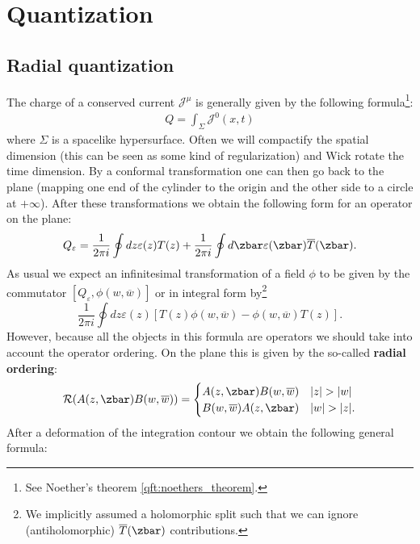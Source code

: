 \section{Quantization}


\subsection{Radial quantization}

    The charge of a conserved current $\mathcal{J}^\mu$ is generally given by the following formula\footnote{See Noether's theorem \ref{qft:noethers_theorem}.}:
    \begin{gather}
        Q = \int_\Sigma\mathcal{J}^0(x, t)
    \end{gather}
    where $\Sigma$ is a spacelike hypersurface. Often we will compactify the spatial dimension (this can be seen as some kind of regularization) and Wick rotate the time dimension. By a conformal transformation one can then go back to the plane (mapping one end of the cylinder to the origin and the other side to a circle at $+\infty$). After these transformations we obtain the following form for an operator on the plane:
    \begin{gather}
        Q_\varepsilon = \frac{1}{2\pi i}\oint dz\varepsilon(z)T(z) + \frac{1}{2\pi i}\oint d\zbar\varepsilon(\zbar)\overline{T}(\zbar).
    \end{gather}
    As usual we expect an infinitesimal transformation of a field $\phi$ to be given by the commutator $[Q_\varepsilon, \phi(w, \overline{w})]$ or in integral form by\footnote{We implicitly assumed a holomorphic split such that we can ignore (antiholomorphic) $\overline{T}(\zbar)$ contributions.} \[\frac{1}{2\pi i}\oint dz\varepsilon(z)[T(z)\phi(w, \overline{w}) - \phi(w, \overline{w})T(z)].\] However, because all the objects in this formula are operators we should take into account the operator ordering. On the plane this is given by the so-called \textbf{radial ordering}:
    \begin{gather}
        \mathcal{R}(A(z, \zbar)B(w, \overline{w})) =
        \begin{cases}
            A(z, \zbar)B(w, \overline{w})&|z|>|w|\\
            B(w, \overline{w})A(z, \zbar)&|w|>|z|.
        \end{cases}
    \end{gather}
    After a deformation of the integration contour we obtain the following general formula:
